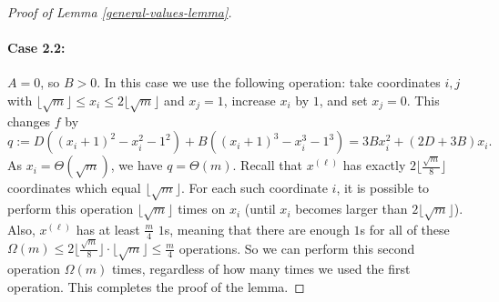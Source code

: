 \documentclass[10pt,a4paper]{amsart}
\begin{document}
\begin{proof}[Proof of Lemma \ref{general-values-lemma}]
    \paragraph{Case 2.2:} $A = 0$, so $B > 0$.
    In this case we use the following operation: take coordinates $i,j$ with  
    $\lfloor \sqrt{m} \rfloor \leq x_i \leq 2 \lfloor \sqrt{m} \rfloor$ and $x_j = 1$, increase $x_i$ by $1$, and set $x_j = 0$. This changes $f$ by 
    $$q := D((x_i+1)^2 - x_i^2 - 1^2) + B((x_i+1)^3 - x_i^3 - 1^3) = 
    3Bx_i^2 + (2D+3B)x_i.
    $$
    As $x_i = \Theta(\sqrt{m})$, we have $q = \Theta(m)$. 
    Recall that $x^{(\ell)}$ has exactly $2 \lfloor \frac{\sqrt{m}}{8} \rfloor$ coordinates which equal $\lfloor \sqrt{m} \rfloor$. For each such coordinate $i$, it is possible to perform this operation $\lfloor \sqrt{m} \rfloor$ times on $x_i$ (until $x_i$ becomes larger than $2 \lfloor \sqrt{m} \rfloor$). Also, $x^{(\ell)}$ has at least $\frac{m}{4}$ $1$s, meaning that there are enough $1$s for all of these $\Omega(m) \leq 2 \lfloor \frac{\sqrt{m}}{8} \rfloor \cdot \lfloor \sqrt{m} \rfloor \leq \frac{m}{4}$ operations. 
    So we can perform this second operation $\Omega(m)$ times, regardless of how many times we used the first operation.
    This completes the proof of the lemma. 
\end{proof}
\end{document}
